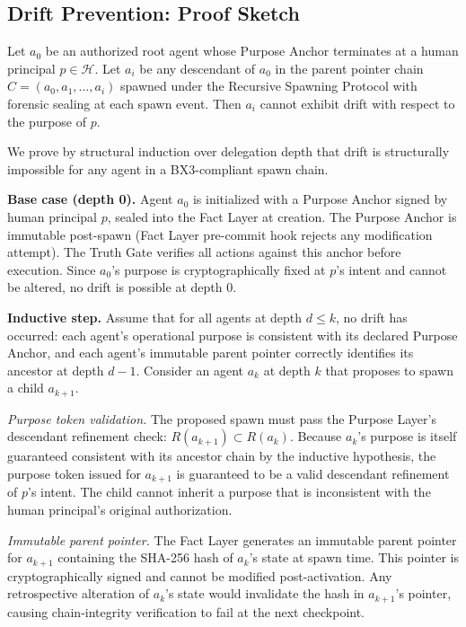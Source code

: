 \subsection{Drift Prevention: Proof Sketch}

\begin{theorem} \label{th:drift-prevention}
Let $a_0$ be an authorized root agent whose Purpose Anchor terminates at a human principal $p \in \mathcal{H}$. Let $a_i$ be any descendant of $a_0$ in the parent pointer chain $C = (a_0, a_1, \ldots, a_i)$ spawned under the Recursive Spawning Protocol with forensic sealing at each spawn event. Then $a_i$ cannot exhibit drift with respect to the purpose of $p$.
\end{theorem}

\begin{Proof}
We prove by structural induction over delegation depth that drift is structurally impossible for any agent in a BX3-compliant spawn chain.

\medskip
\noindent\textbf{Base case (depth 0).} Agent $a_0$ is initialized with a Purpose Anchor signed by human principal $p$, sealed into the Fact Layer at creation. The Purpose Anchor is immutable post-spawn (Fact Layer pre-commit hook rejects any modification attempt). The Truth Gate verifies all actions against this anchor before execution. Since $a_0$'s purpose is cryptographically fixed at $p$'s intent and cannot be altered, no drift is possible at depth 0.

\medskip
\noindent\textbf{Inductive step.} Assume that for all agents at depth $d \leq k$, no drift has occurred: each agent's operational purpose is consistent with its declared Purpose Anchor, and each agent's immutable parent pointer correctly identifies its ancestor at depth $d - 1$. Consider an agent $a_k$ at depth $k$ that proposes to spawn a child $a_{k+1}$.

\textit{Purpose token validation.} The proposed spawn must pass the Purpose Layer's descendant refinement check: $R(a_{k+1}) \subset R(a_k)$. Because $a_k$'s purpose is itself guaranteed consistent with its ancestor chain by the inductive hypothesis, the purpose token issued for $a_{k+1}$ is guaranteed to be a valid descendant refinement of $p$'s intent. The child cannot inherit a purpose that is inconsistent with the human principal's original authorization.

\textit{Immutable parent pointer.} The Fact Layer generates an immutable parent pointer for $a_{k+1}$ containing the SHA-256 hash of $a_k$'s state at spawn time. This pointer is cryptographically signed and cannot be modified post-activation. Any retrospective alteration of $a_k$'s state would invalidate the hash in $a_{k+1}$'s pointer, causing chain-integrity verification to fail at the next checkpoint.


\end{Proof}
